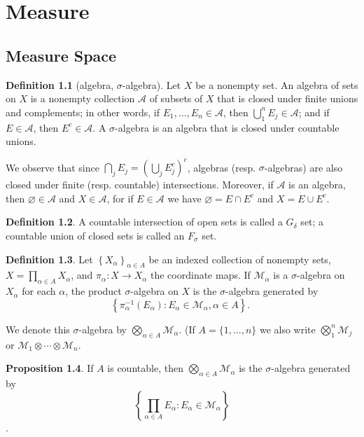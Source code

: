 \documentclass[12pt,a4paper]{book}
\theoremstyle{definition}
\newtheorem{defn}{Definition}[section]
\newtheorem{prop}[defn]{Proposition}
\begin{document}
\chapter{Measure}
\section{Measure Space}
\begin{defn}[algebra, $\sigma$-algebra]
    Let $X$ be a nonempty set. An algebra of sets on $X$ is a nonempty collection $\mathcal{A}$ of subsets of $X$ that is closed under finite unions and complements; in other words, if $E_1, \ldots, E_n \in \mathcal{A}$, then $\bigcup_1^n E_j \in \mathcal{A}$; and if $E \in \mathcal{A}$, then $E^c \in \mathcal{A}$. A $\sigma$-algebra is an algebra that is closed under countable unions.

    We observe that since $\bigcap_j E_j=\left(\bigcup_j E_j^c\right)^c$, algebras (resp. $\sigma$-algebras) are also closed under finite (resp. countable) intersections. Moreover, if $\mathcal{A}$ is an algebra, then $\varnothing \in \mathcal{A}$ and $X \in \mathcal{A}$, for if $E \in \mathcal{A}$ we have $\varnothing=E \cap E^c$ and $X=E \cup E^c$.
\end{defn}
\begin{defn}
    A countable intersection of open sets is called a $G_{\delta}$ set; a countable union of closed sets is called an $F_{\sigma}$ set.
\end{defn}
\begin{defn}
    Let $\left\{X_\alpha\right\}_{\alpha \in A}$ be an indexed collection of nonempty sets, $X=\prod_{\alpha \in A} X_\alpha$, and $\pi_\alpha: X \rightarrow X_\alpha$ the coordinate maps. If $\mathcal{M}_\alpha$ is a $\sigma$-algebra on $X_\alpha$ for each $\alpha$, the product $\sigma$-algebra on $X$ is the $\sigma$-algebra generated by
    $$
        \left\{\pi_\alpha^{-1}\left(E_\alpha\right): E_\alpha \in \mathcal{M}_\alpha, \alpha \in A\right\} \text {. }
    $$

    We denote this $\sigma$-algebra by $\bigotimes_{\alpha \in A} \mathcal{M}_\alpha$. (If $A=\{1, \ldots, n\}$ we also write $\bigotimes_1^n \mathcal{M}_j$ or $\mathcal{M}_1 \otimes \cdots \otimes \mathcal{M}_n$.
\end{defn}
\begin{prop}
    If $A$ is countable, then $\bigotimes_{\alpha \in A} \mathcal{M}_\alpha$ is the $\sigma$-algebra generated by
    $$\left\{\prod_{\alpha \in A} E_\alpha: E_\alpha \in \mathcal{M}_\alpha\right\}$$.
\end{prop}
\end{document}
